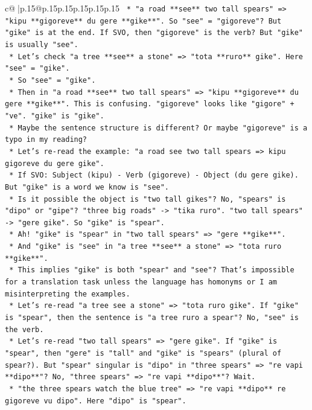 \documentclass{article}
\begin{document}
{\begin{supertabular}{c@{$\;$}|p{.15\linewidth}@{}p{.15\linewidth}p{.15\linewidth}p{.15\linewidth}p{.15\linewidth}p{.15\linewidth}}
{{{\texttt{        *   "a road **see** two tall spears" => "kipu **gigoreve** du gere **gike**". So "see" = "gigoreve"? But "gike" is at the end. If SVO, then "gigoreve" is the verb? But "gike" is usually "see".} \\
\texttt{        *   Let's check "a tree **see** a stone" => "tota **ruro** gike". Here "see" = "gike".} \\
\texttt{        *   So "see" = "gike".} \\
\texttt{        *   Then in "a road **see** two tall spears" => "kipu **gigoreve** du gere **gike**". This is confusing. "gigoreve" looks like "gigore" + "ve". "gike" is "gike".} \\
\texttt{        *   Maybe the sentence structure is different? Or maybe "gigoreve" is a typo in my reading?} \\
\texttt{        *   Let's re{-}read the example: "a road see two tall spears => kipu gigoreve du gere gike".} \\
\texttt{        *   If SVO: Subject (kipu) {-} Verb (gigoreve) {-} Object (du gere gike). But "gike" is a word we know is "see".} \\
\texttt{        *   Is it possible the object is "two tall gikes"? No, "spears" is "dipo" or "gipe"? "three big roads" {-}> "tika ruro". "two tall spears" {-}> "gere gike". So "gike" is "spear".} \\
\texttt{        *   Ah! "gike" is "spear" in "two tall spears" => "gere **gike**".} \\
\texttt{        *   And "gike" is "see" in "a tree **see** a stone" => "tota ruro **gike**".} \\
\texttt{        *   This implies "gike" is both "spear" and "see"? That's impossible for a translation task unless the language has homonyms or I am misinterpreting the examples.} \\
\texttt{        *   Let's re{-}read "a tree see a stone" => "tota ruro gike". If "gike" is "spear", then the sentence is "a tree ruro a spear"? No, "see" is the verb.} \\
\texttt{        *   Let's re{-}read "two tall spears" => "gere gike". If "gike" is "spear", then "gere" is "tall" and "gike" is "spears" (plural of spear?). But "spear" singular is "dipo" in "three spears" => "re vapi **dipo**"? No, "three spears" => "re vapi **dipo**"? Wait.} \\
\texttt{        *   "the three spears watch the blue tree" => "re vapi **dipo** re gigoreve vu dipo". Here "dipo" is "spear".} \\
}}}
\end{supertabular}}
\end{document}
